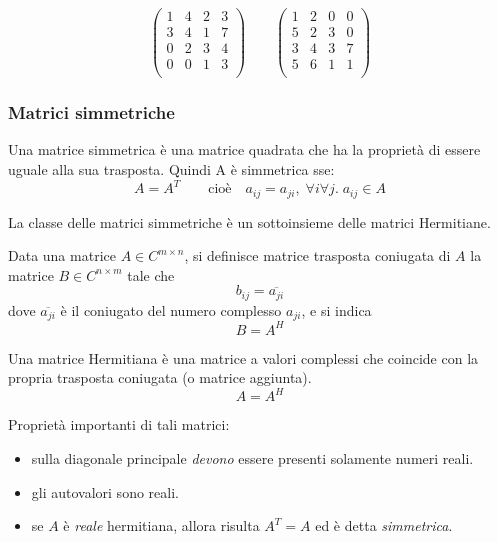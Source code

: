 \begin{example}
\[\begin{pmatrix}
  1 & 4 & 2 & 3 \\
  3 & 4 & 1 & 7 \\
  0 & 2 & 3 & 4 \\
  0 & 0 & 1 & 3 \\
\end{pmatrix}
\qquad
\begin{pmatrix}
  1 & 2 & 0 & 0 \\
  5 & 2 & 3 & 0 \\
  3 & 4 & 3 & 7 \\
  5 & 6 & 1 & 1 \\
\end{pmatrix}\]
\end{example}

\subsubsection{Matrici simmetriche}

\begin{defn}
Una matrice simmetrica \`e una matrice quadrata che ha la proprietà di
essere uguale alla sua trasposta. Quindi A \`e simmetrica sse:
$$ A=A^T \qquad \text{cio\`e} \quad a_{ij} = a_{ji}, \; \forall i \forall j. \; a_{ij} \in A$$
\end{defn}

La classe delle matrici simmetriche \`e un sottoinsieme delle
 matrici Hermitiane.\\

\begin{defn}
Data una matrice $A \in C^{m \times n}$, si definisce matrice
trasposta coniugata di $A$ la matrice $B \in C^{n \times m}$ tale che
$$b_{ij} = \overline{a_{ji}}$$ 
dove $\overline{a_{ji}}$ \`e il coniugato del numero complesso $a_{ji}$,
e si indica
$$B = A^{H}$$
\end{defn}

\begin{defn}
Una matrice Hermitiana \`e una matrice a valori complessi che coincide
con la propria trasposta coniugata (o matrice aggiunta).
  $$ A = A^{H} $$
\end{defn}

Proprietà importanti di tali matrici:
\begin{itemize}
\item sulla diagonale principale \emph{devono} essere presenti solamente
  numeri reali. 
\item gli autovalori sono reali.
\item se $A$ \`e \emph{reale} hermitiana, allora risulta $A^{T} = A$ ed
\`e detta \emph{simmetrica}.
\end{itemize}

